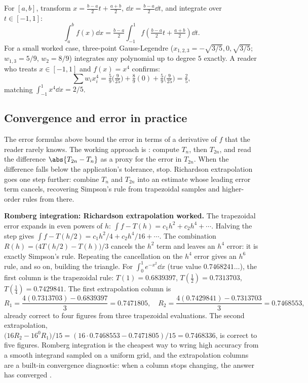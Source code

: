 For $[a,b]$, transform $x = \tfrac{b-a}{2} t + \tfrac{a+b}{2}$, $\dd
x = \tfrac{b-a}{2} \dd t$, and integrate over $t \in [-1, 1]$:
\[
\int_{a}^{b} f(x) \dd x = \tfrac{b-a}{2} \int_{-1}^{1}
f\!\left(\tfrac{b-a}{2} t + \tfrac{a+b}{2}\right) \dd t.
\]
For a small worked case, three-point Gauss-Legendre
($x_{1,2,3} = -\sqrt{3/5}, 0, \sqrt{3/5}$;
$w_{1,3} = 5/9$, $w_{2} = 8/9$) integrates any polynomial up to
degree $5$ exactly. A reader who treats $x \in [-1, 1]$ and
$f(x) = x^{4}$ confirms:
\[
\sum w_{i} x_{i}^{4} = \tfrac{5}{9}\bigl(\tfrac{9}{25}\bigr) +
\tfrac{8}{9}(0) + \tfrac{5}{9}\bigl(\tfrac{9}{25}\bigr) =
\tfrac{2}{5},
\]
matching $\int_{-1}^{1} x^{4} \dd x = 2/5$.

\subsection{Convergence and error in practice}

The error formulas above bound the error in terms of a derivative of
$f$ that the reader rarely knows. The working approach is
: compute $T_{n}$, then $T_{2n}$,
and read the difference $\abs{T_{2n} - T_{n}}$ as a proxy for the
error in $T_{2n}$. When the difference falls below the
application's tolerance, stop. Richardson extrapolation goes one
step further: combine $T_{n}$ and $T_{2n}$ into an estimate whose
leading error term cancels, recovering Simpson's rule from
trapezoidal samples and higher-order rules from there.

\begin{mastery}
\textbf{Romberg integration: Richardson extrapolation worked.}
The trapezoidal error expands in even powers of $h$:
$\int f - T(h) = c_{1}h^{2} + c_{2}h^{4} + \cdots$. Halving the
step gives $\int f - T(h/2) = c_{1}h^{2}/4 + c_{2}h^{4}/16 +
\cdots$. The combination $R(h) = \bigl(4T(h/2) - T(h)\bigr)/3$
cancels the $h^{2}$ term and leaves an $h^{4}$ error: it is exactly
Simpson's rule. Repeating the cancellation on the $h^{4}$ error
gives an $h^{6}$ rule, and so on, building the 
triangle. For $\int_{0}^{1}e^{-x^{2}}\dd x$ (true value
$0.7468241\ldots$), the first column is the trapezoidal rule:
$T(1) = 0.6839397$, $T(\tfrac{1}{2}) = 0.7313703$, $T(\tfrac{1}{4})
= 0.7429841$. The first extrapolation column is
\[
R_{1} = \frac{4(0.7313703) - 0.6839397}{3} = 0.7471805,\quad
R_{2} = \frac{4(0.7429841) - 0.7313703}{3} = 0.7468553,
\]
already correct to four figures from three trapezoidal evaluations.
The second extrapolation, $\bigl(16 R_{2} - 16^{0}R_{1}\bigr)/15 =
(16\cdot 0.7468553 - 0.7471805)/15 = 0.7468336$, is correct to five
figures. Romberg integration is the cheapest way to wring high
accuracy from a smooth integrand sampled on a uniform grid, and the
extrapolation columns are a built-in convergence diagnostic: when a
column stops changing, the answer has converged
\cite{text:v2ch06-burden-faires-numerical}.
\end{mastery}

